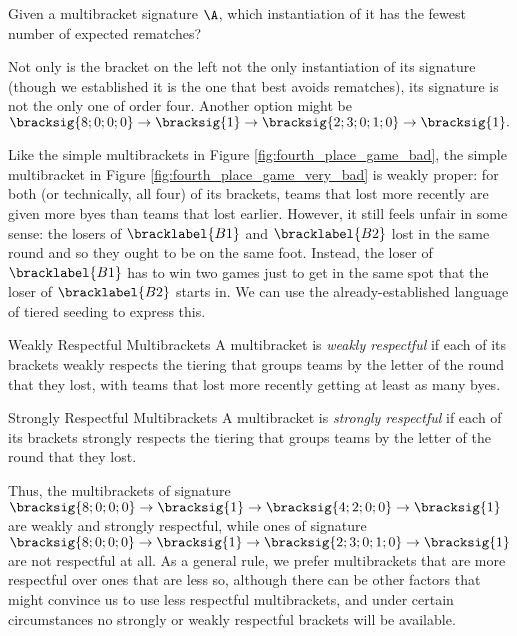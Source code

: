 {    \begin{oq}{}{}
        Given a multibracket signature $\A$, which instantiation of it has the fewest number of expected rematches?
    \end{oq}

    Not only is the bracket on the left not the only instantiation of its signature (though we established it is the one that best avoids rematches), its signature is not the only one of order four. Another option might be $\bracksig{8;0;0;0} \to \bracksig{1} \to \bracksig{2; 3; 0; 1; 0} \to \bracksig{1}.$


    Like the simple multibrackets in Figure \ref{fig:fourth_place_game_bad}, the simple multibracket in Figure \ref{fig:fourth_place_game_very_bad} is weakly proper: for both (or technically, all four) of its brackets, teams that lost more recently are given more byes than teams that lost earlier. However, it still feels unfair in some sense: the losers of $\bracklabel{B1}$ and $\bracklabel{B2}$ lost in the same round and so they ought to be on the same foot. Instead, the loser of $\bracklabel{B1}$ has to win two games just to get in the same spot that the loser of $\bracklabel{B2}$ starts in. We can use the already-established language of tiered seeding to express this.

    \begin{definition}{Weakly Respectful Multibrackets}{}
        A multibracket is \textit{weakly respectful} if each of its brackets weakly respects the tiering that groups teams by the letter of the round that they lost, with teams that lost more recently getting at least as many byes.
    \end{definition}

    \begin{definition}{Strongly Respectful Multibrackets}{}
        A multibracket is \textit{strongly respectful} if each of its brackets strongly respects the tiering that groups teams by the letter of the round that they lost.
    \end{definition}

    Thus, the multibrackets of signature $\bracksig{8;0;0;0} \to \bracksig{1} \to \bracksig{4; 2; 0; 0} \to \bracksig{1}$ are weakly and strongly respectful, while ones of signature $\bracksig{8;0;0;0} \to \bracksig{1} \to \bracksig{2; 3; 0; 1; 0} \to \bracksig{1}$ are not respectful at all. As a general rule, we prefer multibrackets that are more respectful over ones that are less so, although there can be other factors that might convince us to use less respectful multibrackets, and under certain circumstances no strongly or weakly respectful brackets will be available.

}
